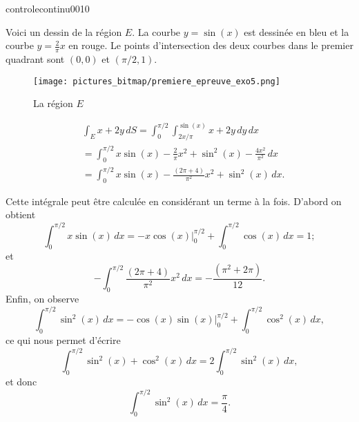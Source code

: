 \begin{corrige}{controlecontinu0010}

Voici un dessin de la région $E$.  La courbe $y=\sin(x)$ est dessinée en bleu et la courbe  $y=\frac{2}{\pi}x$ en rouge. Le points d'intersection des deux courbes dans le premier quadrant sont $(0,0)$  et $(\pi/2, 1)$. 
\begin{figure}
  \begin{center}
            \texttt{[image: pictures\_bitmap/premiere\_epreuve\_exo5.png]}
  \caption{La région $E$}
  \end{center}
 \end{figure}
 
\begin{equation}
  \begin{aligned}
    &\int_{E}x+2y \, dS=\int_0^{\pi/2}\int_{2x/\pi}^{\sin(x)} x+2y\, dy\,dx\\
    &=\int_0^{\pi/2}x\sin(x)-\frac{2}{\pi}x^2+\sin^2(x)-\frac{4x^2}{\pi^2}\,dx\\
    &=\int_0^{\pi/2}x\sin(x)-\frac{(2\pi+ 4)}{\pi^2}x^2+\sin^2(x)\,dx.
  \end{aligned}
\end{equation}

Cette intégrale peut être calculée en considérant un terme à la fois. D'abord on obtient
\[
\int_0^{\pi/2}x\sin(x)\,dx=\left.-x\cos(x)\right\vert_{0}^{\pi/2}+\int_0^{\pi/2}\cos(x)\,dx=1 ;
\]
et
\[
-\int_0^{\pi/2}\frac{(2\pi+ 4)}{\pi^2}x^2 \,dx=-\frac{(\pi^2+ 2\pi)}{12}.
\]
Enfin, on observe 
\[
\int_0^{\pi/2}\sin^2(x)\,dx=\left. -\cos(x)\sin(x)\right\vert_{0}^{\pi/2}+ \int_0^{\pi/2}\cos^2(x)\,dx,
\]
ce qui nous permet d'écrire
 \[
\int_0^{\pi/2}\sin^2(x)+\cos^2(x) \,dx=2 \int_0^{\pi/2}\sin^2(x)\,dx,
\]
et donc
\[
\int_0^{\pi/2}\sin^2(x)\,dx=\frac{\pi}{4}.
\]
\end{corrige}
